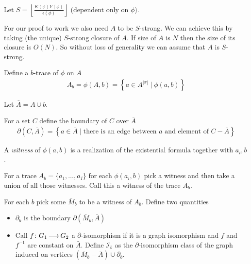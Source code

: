 \documentclass{amsart}
\newcommand{\II}{\mathscr I}
\newcommand{\curly}[1]{\left\{#1\right\}}
\providecommand{\floor}[1]{\left \lfloor #1 \right \rfloor }
\begin{document}
Let $S = \floor{\frac{K(\phi)Y(\phi)}{\epsilon(\phi)}}$ (dependent only on $\phi$).

For our proof to work we also need $A$ to be $S$-strong.
We can achieve this by taking (the unique) $S$-strong closure of $A$.
If size of $A$ is $N$ then the size of its closure is $O(N)$.	%
So without loss of generality we can assume that $A$ is $S$-strong.

\begin{Definition}
	Define a $b$-trace of $\phi$ on $A$
	\begin{align*}
		A_b = \phi(A, b) = \curly{a \in A^{|x|} \mid \phi(a, b)}
	\end{align*}
\end{Definition}

Let $\bar A = A \cup b$. %

\begin{Definition}
	For a set $C$ define the boundary of $C$ over $\bar A$
	\begin{align*}
		\partial(C, \bar A) = \curly{a \in \bar A \mid \text{there is an edge between $a$ and element of $C - \bar A$}}
	\end{align*}
\end{Definition}

\begin{Definition}
	A \emph{witness} of $\phi(a, b)$ is a realization of the existential formula together with ${a_i, b}$.
\end{Definition}

\begin{Definition}
	For a trace $A_b = \{a_1, \ldots, a_I\}$ for each $\phi(a_i, b)$ pick a witness and then take a union of all those witnesses. Call this a witness of the trace $A_b$.	%
\end{Definition}

\begin{Definition}
	For each $b$ pick some $\bar M_b$ to be a witness of $A_b$. Define two quantities
	\begin{itemize}
		\item $\partial_b$ is the boundary $\partial(\bar M_b, \bar A)$
		\item Call $f \colon G_1 \operatorname{\longrightarrow} G_2$ a $\partial$-isomorphism if it is a graph isomorphism and $f$ and $f^{-1}$ are constant on $\bar A$.
		Define $\II_b$ as the $\partial$-isomorphism class of the graph induced on vertices $(\bar M_b - \bar A) \cup \partial_b$. %
	\end{itemize}
\end{Definition}
\end{document}
